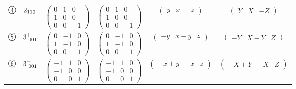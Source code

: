 \documentclass[fleqn,10pt,landscape]{jsarticle}
\begin{document}
\begin{center}
\begin{longtable}{lcccc}
$ {\ooalign{\hfil\resizebox{.8\width}{\height}{4}\hfil\crcr\raise.1ex\hbox{\large$\bigcirc$}}}\quad 2{}_{110} $ & $ \begin{pmatrix} 0 & 1 & 0 \\ 1 & 0 & 0 \\ 0 & 0 & -1 \end{pmatrix} $ & $ \begin{pmatrix} 0 & 1 & 0 \\ 1 & 0 & 0 \\ 0 & 0 & -1 \end{pmatrix} $ & $ \begin{pmatrix} y & x & - z \end{pmatrix} $ & $ \begin{pmatrix} Y & X & - Z \end{pmatrix} $ \\
$ {\ooalign{\hfil\resizebox{.8\width}{\height}{5}\hfil\crcr\raise.1ex\hbox{\large$\bigcirc$}}}\quad 3^{+}_{\,\,001} $ & $ \begin{pmatrix} 0 & -1 & 0 \\ 1 & -1 & 0 \\ 0 & 0 & 1 \end{pmatrix} $ & $ \begin{pmatrix} 0 & -1 & 0 \\ 1 & -1 & 0 \\ 0 & 0 & 1 \end{pmatrix} $ & $ \begin{pmatrix} - y & x - y & z \end{pmatrix} $ & $ \begin{pmatrix} - Y & X - Y & Z \end{pmatrix} $ \\
$ {\ooalign{\hfil\resizebox{.8\width}{\height}{6}\hfil\crcr\raise.1ex\hbox{\large$\bigcirc$}}}\quad 3^{-}_{\,\,001} $ & $ \begin{pmatrix} -1 & 1 & 0 \\ -1 & 0 & 0 \\ 0 & 0 & 1 \end{pmatrix} $ & $ \begin{pmatrix} -1 & 1 & 0 \\ -1 & 0 & 0 \\ 0 & 0 & 1 \end{pmatrix} $ & $ \begin{pmatrix} - x + y & - x & z \end{pmatrix} $ & $ \begin{pmatrix} - X + Y & - X & Z \end{pmatrix} $ \\

\end{longtable}
\end{center}
\end{document}
